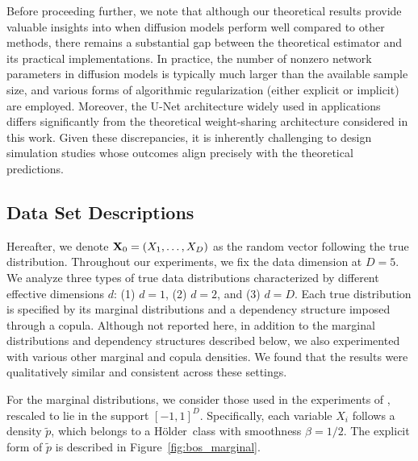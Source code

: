 \documentclass[twoside,11pt]{article}
\newcommand{\bX}{{\bf X}}
\newcommand{\Holder}{H\"{o}lder}
\begin{document}
Before proceeding further, we note that although our theoretical results provide valuable insights into when diffusion models perform well compared to other methods, there remains a substantial gap between the theoretical estimator and its practical implementations. In practice, the number of nonzero network parameters in diffusion models is typically much larger than the available sample size, and various forms of algorithmic regularization (either explicit or implicit) are employed. Moreover, the U-Net architecture widely used in applications differs significantly from the theoretical weight-sharing architecture considered in this work. Given these discrepancies, it is inherently challenging to design simulation studies whose outcomes align precisely with the theoretical predictions.



\subsection{Data Set Descriptions}

Hereafter, we denote $\bX_0 = (X_1,\ldots,X_{D})$ as the random vector following the true distribution.
Throughout our experiments, we fix the data dimension at $D = 5$. We analyze three types of true data distributions characterized by different effective dimensions $d$: (1) $d = 1$, (2) $d = 2$, and (3) $d = D$. Each true distribution is specified by its marginal distributions and a dependency structure imposed through a copula.
Although not reported here, in addition to the marginal distributions and dependency structures described below, we also experimented with various other marginal and copula densities. We found that the results were qualitatively similar and consistent across these settings.

For the marginal distributions, we consider those used in the experiments of \citet{bos2024supervised}, rescaled to lie in the support $[-1,1]^{D}$.
Specifically, each variable $X_i $ follows a density $\widetilde p$, which belongs to a \Holder \ class with smoothness $\beta = 1/2$.
The explicit form of $\widetilde p$ is described in Figure~\ref{fig:bos_marginal}.
\end{document}

